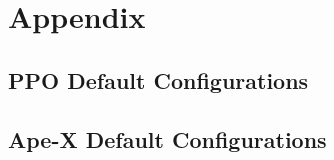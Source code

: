 \chapter{Appendix}

\section{PPO Default Configurations}\label{ppo_default}


\section{Ape-X Default Configurations}\label{apex_default}
